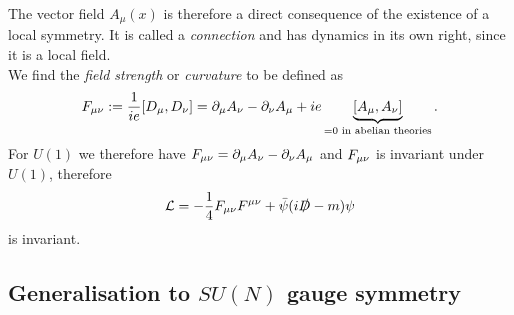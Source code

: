 The vector field $A_\mu(x)$ is therefore a direct consequence of the existence of a local symmetry. It is called a \emph{connection} and has dynamics in its own right, since it is a local field.\\
We find the \emph{field strength} or \emph{curvature} to be defined as
\begin{equation}
F_{\mu \nu} := \frac{1}{i e} [D_\mu , D_\nu] = \partial_\mu A_\nu - \partial_ \nu A_\mu + i e \underbrace{[A_\mu,A_\nu]}_{=0\text{ in abelian theories}}.
\end{equation}
For $U(1)$ we therefore have $F_{\mu \nu} = \partial_\mu A_\nu - \partial_\nu A_\mu$ and $F_{\mu \nu}$ is invariant under $U(1)$, therefore
\begin{equation}
	\mathcal{L} = -\frac{1}{4} F_{\mu \nu} F^{\mu\nu} + \bar{\psi} (i \slashed{D} - m) \psi
\end{equation}
is invariant.
\subsection{Generalisation to $SU(N)$ gauge symmetry}

